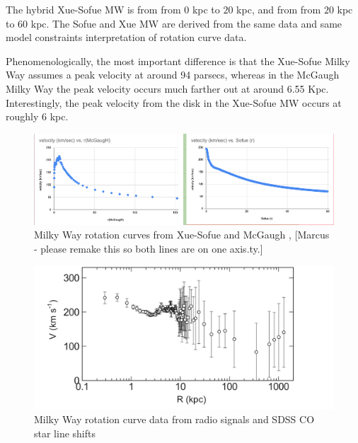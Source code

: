 \documentclass[reprint,%
 amsmath,amssymb,
 aps,
]{revtex4-1}
\begin{document}
The hybrid Xue-Sofue MW  is from  \citet{Sofue} from   $0$ kpc to $20$ kpc, and from \citet{Xue} from
  $20$ kpc to $60$ kpc. The Sofue and Xue MW are derived from the same data and same model constraints  interpretation of rotation curve data.  
  
 
   
Phenomenologically, the most important difference is that the 
  Xue-Sofue Milky Way assumes a peak velocity   at around 94 parsecs, whereas in the McGaugh Milky Way the peak velocity occurs much farther out at around
  6.55 Kpc. Interestingly, the peak velocity from the disk in the Xue-Sofue MW occurs at roughly 6 kpc. 
  
  
  \begin{figure}
    \centering
    \includegraphics[width=\linewidth]{figures/MWXueSofueVMcGaugh.png}
    \caption{Milky Way rotation curves
   from Xue-Sofue and McGaugh \cite{sofue2009unified}, \cite{McGaugh_2019} [Marcus - please remake this so both lines are on one axis.ty.]}
    \label{fig:mwSofuevMcGaugh}
\end{figure}

 \begin{figure}
    \centering
    \includegraphics[width=\linewidth]{Sofue_MWtoLGData}
    \caption{Milky Way rotation curve data from radio signals and SDSS CO star line shifts  \cite{Sof11}}
    \label{fig:mwSofue}
\end{figure}
\end{document}
